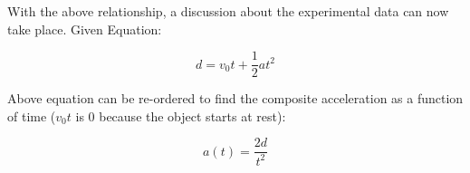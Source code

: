 With the above relationship, a discussion about the experimental data can now take place. Given Equation:

\begin{equation}
  d = v_0t + \frac{1}{2}at^2
\end{equation}

Above equation can be re-ordered to find the composite acceleration as a function of time ($v_0t$ is 0 because the object starts at rest):

\begin{equation}
  a(t) = \frac{2d}{t^2}
\end{equation}

\begin{table}[H]
  \centering
  \caption{Experimental data with calculated acceleration}
  \label{table:experimental_data_table_with_acceleration}
\end{table}

